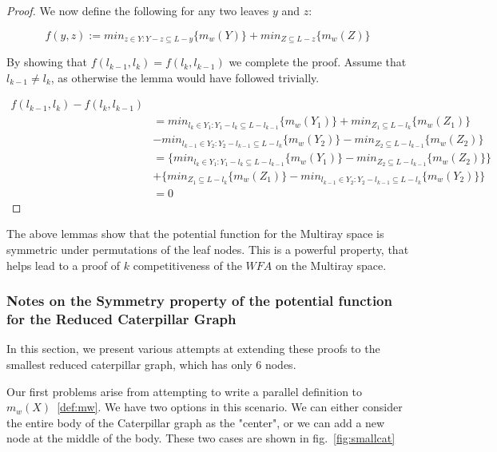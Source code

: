 \begin{proof}
    We now define the following for any two leaves $y$ and $z$: 

    \begin{equation*}
        f(y, z) := min_{z \in Y : Y - z \subseteq L-y} \{ m_w(Y)\} + min_{Z \subseteq L-z} \{ m_w(Z)\}
    \end{equation*}

    By showing that $f(l_{k-1}, l_k) = f(l_k, l_{k-1})$ we complete the proof.
    Assume that $l_{k-1} \neq l_k$, as otherwise the lemma would have followed trivially. 

    \begin{equation*}
        \begin{split}
        f(l_{k-1}, l_k) - f(l_k, l_{k-1})\\
        &= min_{l_k \in Y_1 : Y_1 - l_k \subseteq L - l_{k-1}} \{ m_w(Y_1)\} + min_{Z_1 \subseteq L - l_k} \{ m_w(Z_1)\} \\
        &- min_{l_{k-1} \in Y_2 : Y_2 - l_{k-1} \subseteq L - l_k} \{ m_w(Y_2)\} - min_{Z_2 \subseteq L - l_{k-1}} \{ m_w(Z_2)\} \\
        &= \{ min_{l_k \in Y_1 : Y_1 - l_k \subseteq L - l_{k-1}} \{ m_w(Y_1)\} - min_{Z_2 \subseteq L - l_{k-1}} \{ m_w(Z_2)\}\}\\
        &+ \{min_{Z_1 \subseteq L - l_k} \{ m_w(Z_1)\} - min_{l_{k-1} \in Y_2 : Y_2 - l_{k-1} \subseteq L - l_k} \{ m_w(Y_2)\}\} \\ 
        &= 0
        \end{split}
    \end{equation*}
\end{proof}

The above lemmas show that the potential function for the Multiray space is symmetric under permutations of the leaf nodes. This is a powerful property, that helps lead to a proof of $k$ competitiveness of the $WFA$ on the Multiray space.

\subsubsection*{Notes on the Symmetry property of the potential function for the Reduced Caterpillar Graph}

In this section, we present various attempts at extending these proofs to the smallest reduced caterpillar graph, which has only 6 nodes.

Our first problems arise from attempting to write a parallel definition to $m_w(X)$~\ref{def:mw}. We have two options in this scenario. We can either consider the entire body of the Caterpillar graph as the "center", or we can add a new node at the middle of the body. These two cases are shown in fig.~\ref{fig:smallcat}

